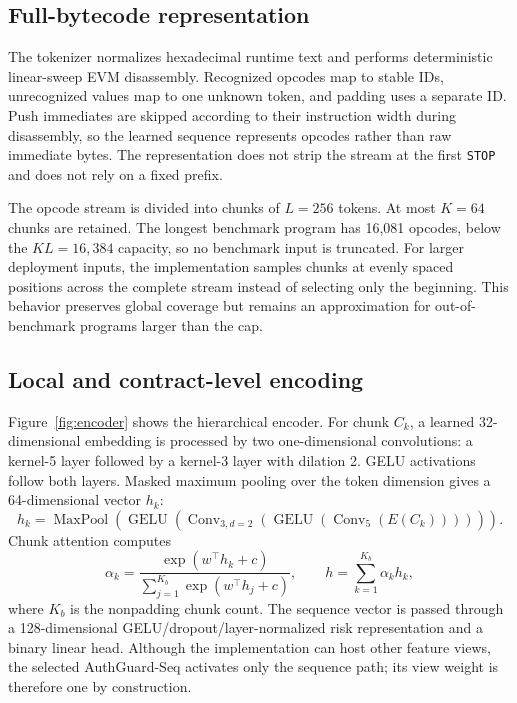 \documentclass[conference]{IEEEtran}
\newcommand{\model}{AuthGuard-Seq}
\newcommand{\code}[1]{\texttt{#1}}
\begin{document}
\subsection{Full-bytecode representation}

The tokenizer normalizes hexadecimal runtime text and performs deterministic linear-sweep EVM
disassembly. Recognized opcodes map to stable IDs, unrecognized values map to one unknown token,
and padding uses a separate ID. Push immediates are skipped according to their instruction width
during disassembly, so the learned sequence represents opcodes rather than raw immediate bytes.
The representation does not strip the stream at the first \code{STOP} and does not rely on a
fixed prefix.

The opcode stream is divided into chunks of $L=256$ tokens. At most $K=64$ chunks are retained.
The longest benchmark program has 16,081 opcodes, below the $KL=16{,}384$ capacity, so no
benchmark input is truncated. For larger deployment inputs, the implementation samples chunks at
evenly spaced positions across the complete stream instead of selecting only the beginning.
This behavior preserves global coverage but remains an approximation for out-of-benchmark
programs larger than the cap.

\subsection{Local and contract-level encoding}

Figure~\ref{fig:encoder} shows the hierarchical encoder. For chunk $C_k$, a learned 32-dimensional
embedding is processed by two one-dimensional convolutions: a kernel-5 layer followed by a
kernel-3 layer with dilation 2. GELU activations follow both layers. Masked maximum pooling over
the token dimension gives a 64-dimensional vector $h_k$:
\begin{equation}
  h_k=\operatorname{MaxPool}\!\left(
    \operatorname{GELU}\left(\operatorname{Conv}_{3,d=2}
    (\operatorname{GELU}(\operatorname{Conv}_{5}(E(C_k))))\right)\right).
\end{equation}
Chunk attention computes
\begin{equation}
  \alpha_k=\frac{\exp(w^\top h_k+c)}{\sum_{j=1}^{K_b}\exp(w^\top h_j+c)},
  \qquad h=\sum_{k=1}^{K_b}\alpha_k h_k,
  \label{eq:attention}
\end{equation}
where $K_b$ is the nonpadding chunk count. The sequence vector is passed through a
128-dimensional GELU/dropout/layer-normalized risk representation and a binary linear head.
Although the implementation can host other feature views, the selected \model{} activates only
the sequence path; its view weight is therefore one by construction.
\end{document}
